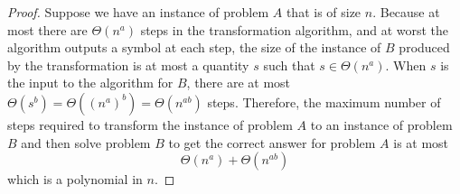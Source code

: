 \documentclass[aip, jmp, amsmath,amssymb, reprint]{revtex4-1}
\theoremstyle{definition}
\begin{document}
\begin{proof}
Suppose we have an instance of problem $A$ that is of size $n$. Because at 
most there are $\Theta(n^a)$ steps in the transformation algorithm, and at 
worst the algorithm outputs a symbol at each step, the size of the instance 
of $B$ produced by the transformation is at most a quantity $s$ such that 
$s \in \Theta(n^a)$. 
When $s$ is the input to the algorithm for $B$, there are at most 
$\Theta\left(s^b\right) = \Theta\left((n^a)^b\right) = 
\Theta\left(n^{ab}\right)$ steps. Therefore, 
the maximum number of steps required to transform the instance of problem $A$ 
to an instance of problem $B$ and then solve problem $B$ to get the correct 
answer for problem $A$ is at most
$$
\Theta(n^a) + \Theta\left(n^{ab}\right)
$$
which is a polynomial in $n$.
\end{proof}
\end{document}
